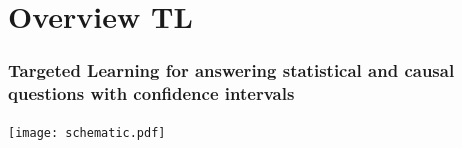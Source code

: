 \documentclass[t]{beamer}
\begin{document}

\section{Overview TL}

\begin{frame}
  \frametitle{Targeted Learning for answering statistical and causal questions with confidence intervals}
  \vspace{-1em}
  \begin{center}
  \texttt{[image: schematic.pdf]}
  \end{center}
\end{frame}
\end{document}
